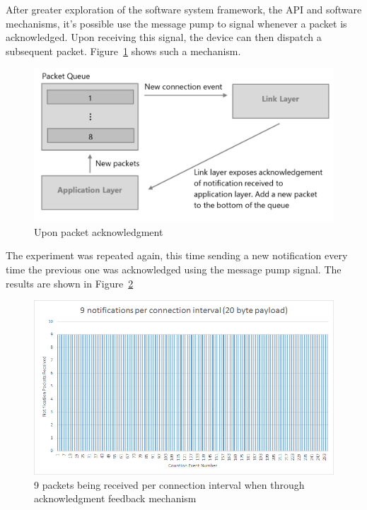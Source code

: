 \documentclass[]{article}
\begin{document}
After greater exploration of the software system framework, the \ac{API} and software mechanisms, it's possible use the message pump to signal whenever a packet is acknowledged. Upon receiving this signal, the device can then dispatch a subsequent packet. Figure~\ref{fig:lsrad} shows such a mechanism. 

\begin{figure}[!h]
	\begin{center}
		\includegraphics[width = \textwidth]{lsrad}
	\end{center}
	\caption{Upon packet acknowledgment }
	\label{fig:lsrad}
\end{figure}

The experiment was repeated again, this time sending a new notification every time the previous one was acknowledged using the message pump signal. The results are shown in Figure~\ref{fig:9pckt}

\begin{figure}[!h]
	\begin{center}
		\includegraphics[width = \textwidth]{9pckt}
	\end{center}
	\caption{9 packets being received per connection interval when through acknowledgment feedback mechanism}
	\label{fig:9pckt}
\end{figure}
 
\end{document}
